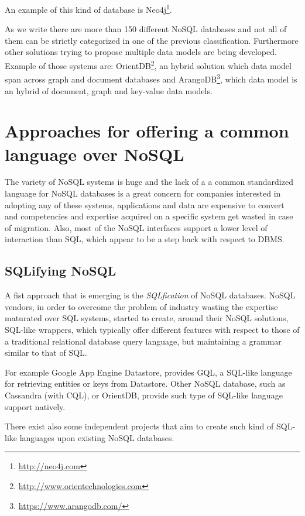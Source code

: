 \noindent An example of this kind of database is Neo4j\footnote{\url{http://neo4j.com}}.

\newparagraph As we write there are more than 150 \cite{online:nosql-database.org} different NoSQL databases and not all of them can be strictly categorized in one of the previous classification. Furthermore other solutions trying to propose multiple data models are being developed. Example of those systems are: OrientDB\footnote{\url{http://www.orientechnologies.com}}, an hybrid solution which data model span across graph and document databases and ArangoDB\footnote{\url{https://www.arangodb.com/}}, which data model is an hybrid of document, graph and key-value data models.

\section{Approaches for offering a common language over NoSQL}
\label{sec:common-language}
The variety of NoSQL systems is huge and the lack of a a common standardized language for NoSQL databases is a great concern for companies interested in adopting any of these systems, applications and data are expensive to convert and competencies and expertise acquired on a specific system get wasted in case of migration. 
Also, most of the NoSQL interfaces support a lower level of interaction than SQL, which appear to be a step back with respect to DBMS.

\subsection{SQLifying NoSQL}
A fist approach that is emerging is the \textit{SQLfication} of NoSQL databases.
NoSQL vendors, in order to overcome the problem of industry wasting the expertise maturated over SQL systems, started to create, around their NoSQL solutions, SQL-like wrappers,  which typically offer different features with respect to those of a traditional relational database query language, but maintaining a grammar similar to that of SQL.

\noindent For example Google App Engine Datastore, provides GQL, a SQL-like language for retrieving entities or keys from Datastore.
Other NoSQL database, such as Cassandra (with CQL), or OrientDB, provide  such type of SQL-like language support natively.

\newparagraph There exist also some independent projects that aim to create such kind of SQL-like languages upon existing NoSQL databases.

